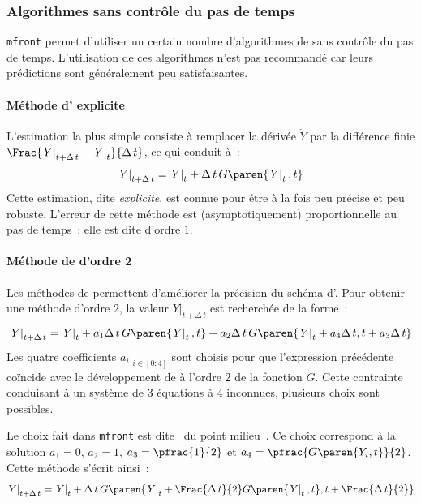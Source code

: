 \documentclass[rectoverso,pleiades,pstricks,leqno,anti]{texmf/note_technique_2010}
\newcommand{\mfront}{\texttt{mfront}}
\newcommand{\debutpas}[1]{\ensuremath{\left.#1\right|_{t}}}
\newcommand{\finpas}[1]{\ensuremath{\left.#1\right|_{t+\Delta\, t}}}
\begin{document}
\subsubsection{Algorithmes sans contrôle du pas de temps}

\mfront{} permet d'utiliser un certain nombre d'algorithmes de
 sans contrôle du pas de temps. L'utilisation de ces
algorithmes n'est pas recommandé car leurs prédictions sont généralement
peu satisfaisantes.

\paragraph{Méthode d' explicite} L'estimation la plus simple
consiste à remplacer la dérivée \(\dot{Y}\) par la différence finie
\(\Frac{\finpas{Y}-\debutpas{Y}}{\Delta\, t}\), ce qui conduit à~:
\begin{equation}
  \label{eq:explicite}
  \finpas{Y}=\debutpas{Y}+\Delta\,t\,G\paren{\debutpas{Y},t}
\end{equation}
Cette estimation, dite {\em explicite}, est connue pour être à la fois
peu précise et peu robuste. L'erreur de cette méthode est
(asymptotiquement) proportionnelle au pas de temps~: elle est dite
d'ordre \(1\).

\paragraph{Méthode de  d'ordre 2}
Les méthodes de  permettent d'améliorer la précision
du schéma d'. Pour obtenir une méthode d'ordre \(2\), la
valeur \(\finpas{Y}\) est recherchée de la forme~:
\[
\finpas{Y} = \debutpas{Y}+a_{1}\Delta\,t\,G\paren{\debutpas{Y},t}+a_{2}\Delta\,t\,G\paren{\debutpas{Y}+a_{4}\Delta\, t,t+a_{3}\Delta\,t}
\]
Les quatre coefficients \(\left.a_{i}\right|_{i \in [0:4]}\) sont
choisis pour que l'expression précédente coïncide avec le
développement de  à l'ordre \(2\) de la fonction \(G\).
Cette contrainte conduisant à un système de \(3\) équations à \(4\)
inconnues, plusieurs choix sont possibles.

Le choix fait dans \mfront{} est dite \og~du point milieu~\fg{}. Ce
choix correspond à la solution \(a_{1}=0\), \(a_{2}=1\),
\(a_{3}=\pfrac{1}{2}\) et \(a_{4}=\pfrac{G\paren{Y_{i},t}}{2}\). Cette
méthode s'écrit ainsi~:
\[
\finpas{Y} = \debutpas{Y}+\Delta\,t\,G\paren{\debutpas{Y}+\Frac{\Delta\,
    t}{2}G\paren{\debutpas{Y},t},t+\Frac{\Delta\, t}{2}}
\]
\end{document}
